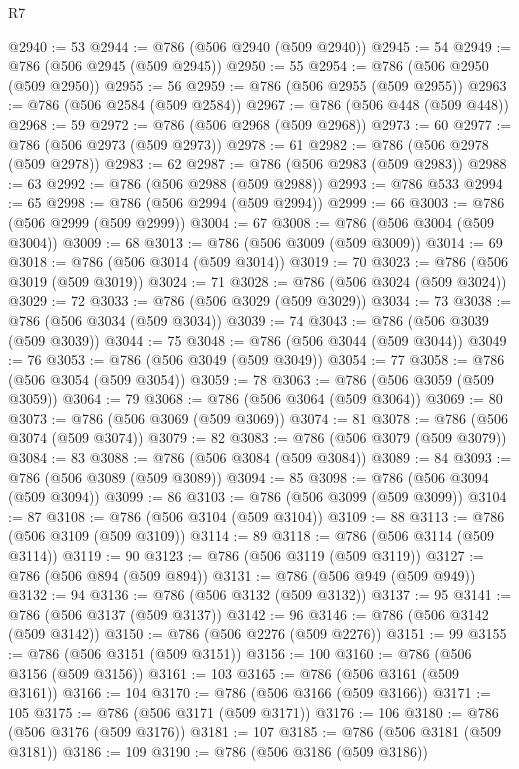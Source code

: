 \begin{lexlean}{R7}
\begin{coremodule}
@2940 := 53
@2944 := @786 (@506 @2940 (@509 @2940))
@2945 := 54
@2949 := @786 (@506 @2945 (@509 @2945))
@2950 := 55
@2954 := @786 (@506 @2950 (@509 @2950))
@2955 := 56
@2959 := @786 (@506 @2955 (@509 @2955))
@2963 := @786 (@506 @2584 (@509 @2584))
@2967 := @786 (@506 @448 (@509 @448))
@2968 := 59
@2972 := @786 (@506 @2968 (@509 @2968))
@2973 := 60
@2977 := @786 (@506 @2973 (@509 @2973))
@2978 := 61
@2982 := @786 (@506 @2978 (@509 @2978))
@2983 := 62
@2987 := @786 (@506 @2983 (@509 @2983))
@2988 := 63
@2992 := @786 (@506 @2988 (@509 @2988))
@2993 := @786 @533
@2994 := 65
@2998 := @786 (@506 @2994 (@509 @2994))
@2999 := 66
@3003 := @786 (@506 @2999 (@509 @2999))
@3004 := 67
@3008 := @786 (@506 @3004 (@509 @3004))
@3009 := 68
@3013 := @786 (@506 @3009 (@509 @3009))
@3014 := 69
@3018 := @786 (@506 @3014 (@509 @3014))
@3019 := 70
@3023 := @786 (@506 @3019 (@509 @3019))
@3024 := 71
@3028 := @786 (@506 @3024 (@509 @3024))
@3029 := 72
@3033 := @786 (@506 @3029 (@509 @3029))
@3034 := 73
@3038 := @786 (@506 @3034 (@509 @3034))
@3039 := 74
@3043 := @786 (@506 @3039 (@509 @3039))
@3044 := 75
@3048 := @786 (@506 @3044 (@509 @3044))
@3049 := 76
@3053 := @786 (@506 @3049 (@509 @3049))
@3054 := 77
@3058 := @786 (@506 @3054 (@509 @3054))
@3059 := 78
@3063 := @786 (@506 @3059 (@509 @3059))
@3064 := 79
@3068 := @786 (@506 @3064 (@509 @3064))
@3069 := 80
@3073 := @786 (@506 @3069 (@509 @3069))
@3074 := 81
@3078 := @786 (@506 @3074 (@509 @3074))
@3079 := 82
@3083 := @786 (@506 @3079 (@509 @3079))
@3084 := 83
@3088 := @786 (@506 @3084 (@509 @3084))
@3089 := 84
@3093 := @786 (@506 @3089 (@509 @3089))
@3094 := 85
@3098 := @786 (@506 @3094 (@509 @3094))
@3099 := 86
@3103 := @786 (@506 @3099 (@509 @3099))
@3104 := 87
@3108 := @786 (@506 @3104 (@509 @3104))
@3109 := 88
@3113 := @786 (@506 @3109 (@509 @3109))
@3114 := 89
@3118 := @786 (@506 @3114 (@509 @3114))
@3119 := 90
@3123 := @786 (@506 @3119 (@509 @3119))
@3127 := @786 (@506 @894 (@509 @894))
@3131 := @786 (@506 @949 (@509 @949))
@3132 := 94
@3136 := @786 (@506 @3132 (@509 @3132))
@3137 := 95
@3141 := @786 (@506 @3137 (@509 @3137))
@3142 := 96
@3146 := @786 (@506 @3142 (@509 @3142))
@3150 := @786 (@506 @2276 (@509 @2276))
@3151 := 99
@3155 := @786 (@506 @3151 (@509 @3151))
@3156 := 100
@3160 := @786 (@506 @3156 (@509 @3156))
@3161 := 103
@3165 := @786 (@506 @3161 (@509 @3161))
@3166 := 104
@3170 := @786 (@506 @3166 (@509 @3166))
@3171 := 105
@3175 := @786 (@506 @3171 (@509 @3171))
@3176 := 106
@3180 := @786 (@506 @3176 (@509 @3176))
@3181 := 107
@3185 := @786 (@506 @3181 (@509 @3181))
@3186 := 109
@3190 := @786 (@506 @3186 (@509 @3186))

\end{coremodule}
\end{lexlean}

